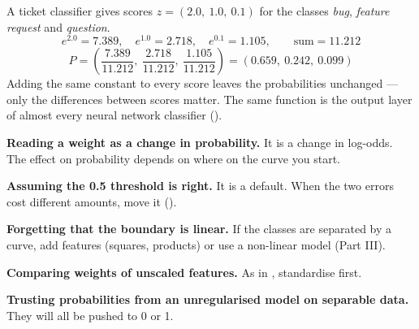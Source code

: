 \begin{worked}
A ticket classifier gives scores $z = (2.0,\ 1.0,\ 0.1)$ for the classes
\emph{bug}, \emph{feature request} and \emph{question}.
\[
e^{2.0} = 7.389,\quad e^{1.0} = 2.718,\quad e^{0.1} = 1.105,\qquad \text{sum} = 11.212
\]
\[
P = \left(\frac{7.389}{11.212},\ \frac{2.718}{11.212},\ \frac{1.105}{11.212}\right)
  = (\mathbf{0.659},\ \mathbf{0.242},\ \mathbf{0.099})
\]
Adding the same constant to every score leaves the probabilities unchanged ---
only the differences between scores matter. The same function is the output layer
of almost every neural network classifier ().
\end{worked}

\begin{pitfall}
\begin{tight}
  \item \textbf{Reading a weight as a change in probability.} It is a change in
        log-odds. The effect on probability depends on where on the curve you
        start.
  \item \textbf{Assuming the 0.5 threshold is right.} It is a default. When the
        two errors cost different amounts, move it ().
  \item \textbf{Forgetting that the boundary is linear.} If the classes are
        separated by a curve, add features (squares, products) or use a
        non-linear model (Part III).
  \item \textbf{Comparing weights of unscaled features.} As in ,
        standardise first.
  \item \textbf{Trusting probabilities from an unregularised model on separable
        data.} They will all be pushed to 0 or 1.
\end{tight}
\end{pitfall}

